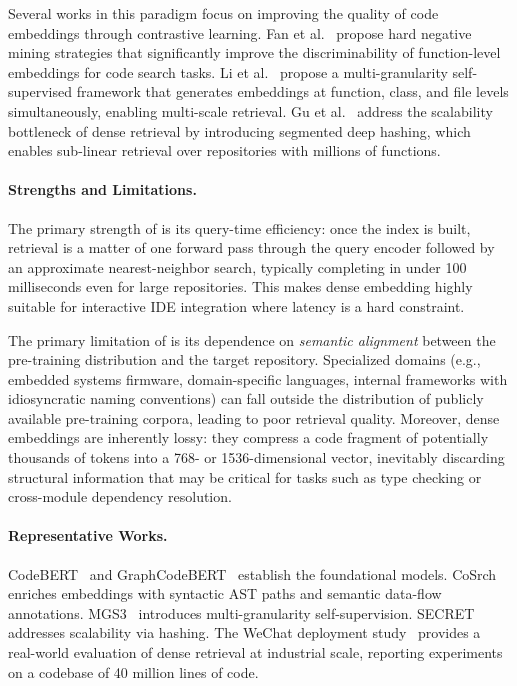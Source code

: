Several works in this paradigm focus on improving the quality of code embeddings through
contrastive learning. Fan et al.~\cite{fan2025effective} propose hard negative mining
strategies that significantly improve the discriminability of function-level embeddings for
code search tasks. Li et al.~\cite{li2025mgs3} propose a multi-granularity self-supervised
framework that generates embeddings at function, class, and file levels simultaneously, enabling
multi-scale retrieval. Gu et al.~\cite{gu2025secret} address the scalability bottleneck of
dense retrieval by introducing segmented deep hashing, which enables sub-linear retrieval over
repositories with millions of functions.

\paragraph{Strengths and Limitations.}
The primary strength of  is its query-time efficiency: once the index is built,
retrieval is a matter of one forward pass through the query encoder followed by an
approximate nearest-neighbor search, typically completing in under 100 milliseconds even for
large repositories. This makes dense embedding highly suitable for interactive IDE integration
where latency is a hard constraint.

The primary limitation of  is its dependence on \emph{semantic alignment} between
the pre-training distribution and the target repository. Specialized domains (e.g., embedded
systems firmware, domain-specific languages, internal frameworks with idiosyncratic naming
conventions) can fall outside the distribution of publicly available pre-training corpora,
leading to poor retrieval quality. Moreover, dense embeddings are inherently lossy: they
compress a code fragment of potentially thousands of tokens into a 768- or 1536-dimensional
vector, inevitably discarding structural information that may be critical for tasks such as
type checking or cross-module dependency resolution.

\paragraph{Representative Works.}
CodeBERT~\cite{feng2020codebert} and GraphCodeBERT~\cite{guo2021graphcodebert} establish the
foundational models. CoSrch~\cite{xu2025cosrch} enriches embeddings with syntactic AST paths
and semantic data-flow annotations. MGS3~\cite{li2025mgs3} introduces multi-granularity
self-supervision. SECRET~\cite{gu2025secret} addresses scalability via hashing. The WeChat
deployment study~\cite{yang2025deepdive} provides a real-world evaluation of dense retrieval
at industrial scale, reporting experiments on a codebase of 40 million lines of code.

